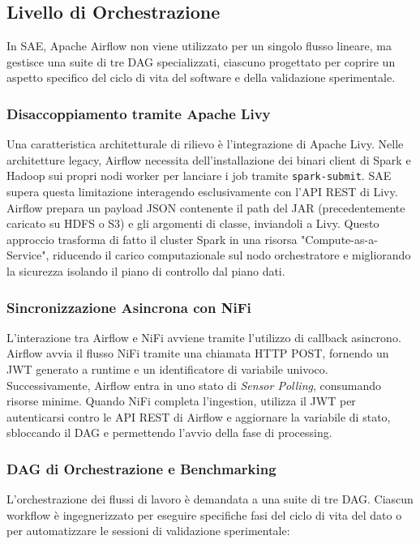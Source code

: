 \documentclass[conference]{IEEEtran}
\begin{document}
\subsection{Livello di Orchestrazione}\label{subsec:orchestration_layer}
In SAE, Apache Airflow non viene utilizzato per un singolo flusso lineare, ma gestisce una suite di tre DAG specializzati, ciascuno progettato per coprire un aspetto specifico del ciclo di vita del software e della validazione sperimentale\@.

\subsubsection{Disaccoppiamento tramite Apache Livy}
Una caratteristica architetturale di rilievo è l'integrazione di Apache Livy.
Nelle architetture legacy, Airflow necessita dell'installazione dei binari client di Spark e Hadoop sui propri nodi worker per lanciare i job tramite \texttt{spark-submit}.
SAE supera questa limitazione interagendo esclusivamente con l'API REST di Livy.
Airflow prepara un payload JSON contenente il path del JAR (precedentemente caricato su HDFS o S3) e gli argomenti di classe, inviandoli a Livy.
Questo approccio trasforma di fatto il cluster Spark in una risorsa "Compute-as-a-Service", riducendo il carico computazionale sul nodo orchestratore e migliorando la sicurezza isolando il piano di controllo dal piano dati\@.

\subsubsection{Sincronizzazione Asincrona con NiFi}
L'interazione tra Airflow e NiFi avviene tramite l'utilizzo di callback asincrono.
Airflow avvia il flusso NiFi tramite una chiamata HTTP POST, fornendo un JWT generato a runtime e un identificatore di variabile univoco.
Successivamente, Airflow entra in uno stato di \textit{Sensor Polling}, consumando risorse minime.
Quando NiFi completa l'ingestion, utilizza il JWT per autenticarsi contro le API REST di Airflow e aggiornare la variabile di stato, sbloccando il DAG e permettendo l'avvio della fase di processing\@.

\subsubsection{DAG di Orchestrazione e Benchmarking}
L'orchestrazione dei flussi di lavoro è demandata a una suite di tre DAG.
Ciascun workflow è ingegnerizzato per eseguire specifiche fasi del ciclo di vita del dato o per automatizzare le sessioni di validazione sperimentale:
\end{document}
